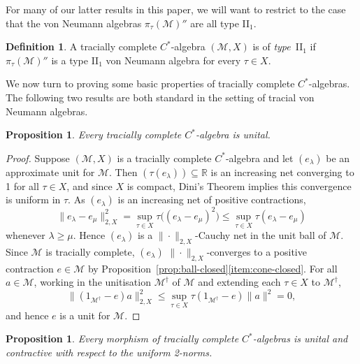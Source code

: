 \documentclass[a4paper,11pt]{amsart}
\newtheorem{proposition}[theorem]{Proposition}
\theoremstyle{definition}
\newtheorem{definition}[theorem]{Definition}
\numberwithin{equation}{section}
\numberwithin{theorem}{section}
\newcommand{\M}{\mathcal{M}}
\begin{document}
For many of our latter results in this paper, we will want to restrict to the case that the von Neumann algebras $\pi_\tau(\M)''$ are all type II$_1$.

\begin{definition}\label{def:II_1}
	A tracially complete $C^*$-algebra $(\M,X)$ is of \emph{type}~II$_1$ if $\pi_\tau(\M)''$ is a type II$_1$ von Neumann algebra for every $\tau \in X$.
\end{definition}  

We now turn to proving some basic properties of tracially complete $C^*$-algebras.
The following two results are both standard in the setting of tracial von Neumann algebras.

\begin{proposition}\label{prop:unital}
	Every tracially complete $C^*$-algebra is unital.
\end{proposition}

\begin{proof}
	Suppose $(\mathcal M, X)$ is a tracially complete $C^*$-algebra and let $(e_\lambda)$ be an approximate unit for $\mathcal M$.  Then $(\tau(e_\lambda)) \subseteq \mathbb R$ is an increasing net converging to 1 for all $\tau \in X$, and since $X$ is compact, Dini's Theorem implies this convergence is uniform in $\tau$.  As $(e_\lambda)$ is an increasing net of positive contractions,
	\begin{equation} \|e_\lambda - e_\mu\|_{2, X}^2 = \sup_{\tau \in X} \tau\big((e_\lambda - e_\mu)^2\big) \leq \sup_{\tau \in X} \tau(e_\lambda - e_\mu)
	\end{equation}
	whenever $\lambda \geq \mu$.
	Hence $(e_\lambda)$ is a $\|\cdot\|_{2, X}$-Cauchy net in the unit ball of $\M$.  Since $\M$ is tracially complete, $(e_\lambda)$ $\|\cdot\|_{2,X}$-converges to a positive contraction $e \in \M$ by Proposition~\ref{prop:ball-closed}\ref{item:cone-closed}.  For all $a \in \mathcal M$, working in the unitisation $\M^\dag$ of $\mathcal M$ and extending each $\tau \in X$ to $\M^\dag$,
	\begin{equation}
		\| (1_{\M^\dag} - e)a \|^2_{2, X} \leq \sup_{\tau \in X} \tau( 1_{\M^\dag}- e) \|a\|^2 = 0, 
	\end{equation}
	and hence $e$ is a unit for $\mathcal M$.
\end{proof}

\begin{proposition}
	Every morphism of tracially complete $C^*$-algebras is unital and contractive with respect to the uniform 2-norms.
\end{proposition}
\end{document}
